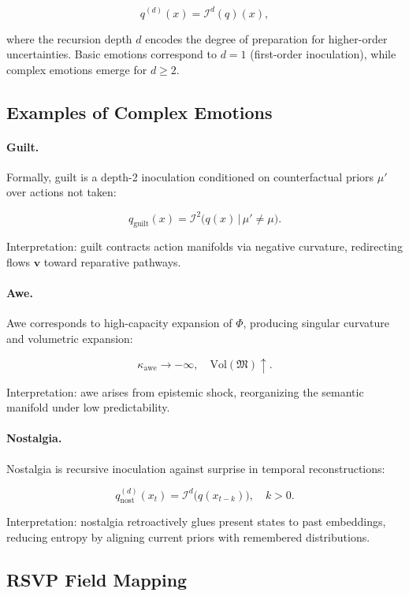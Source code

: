 \documentclass{article}
\theoremstyle{definition}
\begin{document}
\[
q^{(d)}(x) = \mathcal{I}^d(q)(x),
\]

where the recursion depth $d$ encodes the degree of preparation for 
higher-order uncertainties. Basic emotions correspond to $d=1$ 
(first-order inoculation), while complex emotions emerge for $d \geq 2$.

\subsection{Examples of Complex Emotions}

\paragraph{Guilt.}  
Formally, guilt is a depth-2 inoculation conditioned on 
counterfactual priors $\mu'$ over actions not taken:

\[
q_{\text{guilt}}(x) 
= \mathcal{I}^2 \big( q(x) \,\big|\, \mu' \neq \mu \big).
\]

Interpretation: guilt contracts action manifolds via negative curvature, 
redirecting flows $\mathbf{v}$ toward reparative pathways.

\paragraph{Awe.}  
Awe corresponds to high-capacity expansion of $\Phi$, producing 
singular curvature and volumetric expansion:

\[
\kappa_{\text{awe}} \to -\infty, 
\quad \mathrm{Vol}(\mathfrak{M}) \uparrow.
\]

Interpretation: awe arises from epistemic shock, reorganizing the 
semantic manifold under low predictability.

\paragraph{Nostalgia.}  
Nostalgia is recursive inoculation against surprise in temporal 
reconstructions:

\[
q^{(d)}_{\text{nost}}(x_t) 
= \mathcal{I}^d \big( q(x_{t-k}) \big), 
\quad k>0.
\]

Interpretation: nostalgia retroactively glues present states to 
past embeddings, reducing entropy by aligning current priors 
with remembered distributions.

\subsection{RSVP Field Mapping}
\end{document}
